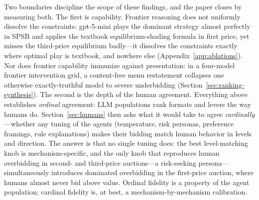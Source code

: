 Two boundaries discipline the scope of these findings, and the paper closes by measuring both. The first is capability. Frontier reasoning does not uniformly dissolve the constraints: gpt-5-mini plays the dominant strategy almost perfectly in SPSB and applies the textbook equilibrium-shading formula in first price, yet misses the third-price equilibrium badly---it dissolves the constraints exactly where optimal play is textbook, and nowhere else (Appendix~\ref{app:ablations}). Nor does frontier capability immunize against presentation: in a four-model frontier intervention grid, a content-free menu restatement collapses one otherwise exactly-truthful model to severe underbidding (Section~\ref{sec:ranking-synthesis}). The second is the depth of the human agreement. Everything above establishes \emph{ordinal} agreement: LLM populations rank formats and levers the way humans do. Section~\ref{sec:humans} then asks what it would take to agree \emph{cardinally}---whether any tuning of the agents (temperature, risk personas, preference framings, rule explanations) makes their bidding match human behavior in levels and direction. The answer is that no single tuning does: the best level-matching knob is mechanism-specific, and the only knob that reproduces human overbidding in second- and third-price auctions---a risk-seeking persona---simultaneously introduces dominated overbidding in the first-price auction, where humans almost never bid above value. Ordinal fidelity is a property of the agent population; cardinal fidelity is, at best, a mechanism-by-mechanism calibration.

